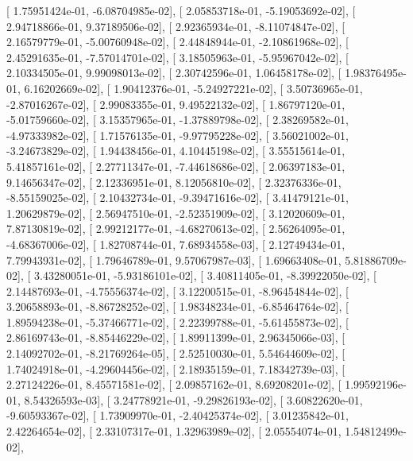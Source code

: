 \documentclass{article}
\begin{document}
       [  1.75951424e-01,  -6.08704985e-02],
       [  2.05853718e-01,  -5.19053692e-02],
       [  2.94718866e-01,   9.37189506e-02],
       [  2.92365934e-01,  -8.11074847e-02],
       [  2.16579779e-01,  -5.00760948e-02],
       [  2.44848944e-01,  -2.10861968e-02],
       [  2.45291635e-01,  -7.57014701e-02],
       [  3.18505963e-01,  -5.95967042e-02],
       [  2.10334505e-01,   9.99098013e-02],
       [  2.30742596e-01,   1.06458178e-02],
       [  1.98376495e-01,   6.16202669e-02],
       [  1.90412376e-01,  -5.24927221e-02],
       [  3.50736965e-01,  -2.87016267e-02],
       [  2.99083355e-01,   9.49522132e-02],
       [  1.86797120e-01,  -5.01759660e-02],
       [  3.15357965e-01,  -1.37889798e-02],
       [  2.38269582e-01,  -4.97333982e-02],
       [  1.71576135e-01,  -9.97795228e-02],
       [  3.56021002e-01,  -3.24673829e-02],
       [  1.94438456e-01,   4.10445198e-02],
       [  3.55515614e-01,   5.41857161e-02],
       [  2.27711347e-01,  -7.44618686e-02],
       [  2.06397183e-01,   9.14656347e-02],
       [  2.12336951e-01,   8.12056810e-02],
       [  2.32376336e-01,  -8.55159025e-02],
       [  2.10432734e-01,  -9.39471616e-02],
       [  3.41479121e-01,   1.20629879e-02],
       [  2.56947510e-01,  -2.52351909e-02],
       [  3.12020609e-01,   7.87130819e-02],
       [  2.99212177e-01,  -4.68270613e-02],
       [  2.56264095e-01,  -4.68367006e-02],
       [  1.82708744e-01,   7.68934558e-03],
       [  2.12749434e-01,   7.79943931e-02],
       [  1.79646789e-01,   9.57067987e-03],
       [  1.69663408e-01,   5.81886709e-02],
       [  3.43280051e-01,  -5.93186101e-02],
       [  3.40811405e-01,  -8.39922050e-02],
       [  2.14487693e-01,  -4.75556374e-02],
       [  3.12200515e-01,  -8.96454844e-02],
       [  3.20658893e-01,  -8.86728252e-02],
       [  1.98348234e-01,  -6.85464764e-02],
       [  1.89594238e-01,  -5.37466771e-02],
       [  2.22399788e-01,  -5.61455873e-02],
       [  2.86169743e-01,  -8.85446229e-02],
       [  1.89911399e-01,   2.96345066e-03],
       [  2.14092702e-01,  -8.21769264e-05],
       [  2.52510030e-01,   5.54644609e-02],
       [  1.74024918e-01,  -4.29604456e-02],
       [  2.18935159e-01,   7.18342739e-03],
       [  2.27124226e-01,   8.45571581e-02],
       [  2.09857162e-01,   8.69208201e-02],
       [  1.99592196e-01,   8.54326593e-03],
       [  3.24778921e-01,  -9.29826193e-02],
       [  3.60822620e-01,  -9.60593367e-02],
       [  1.73909970e-01,  -2.40425374e-02],
       [  3.01235842e-01,   2.42264654e-02],
       [  2.33107317e-01,   1.32963989e-02],
       [  2.05554074e-01,   1.54812499e-02],
\end{document}
